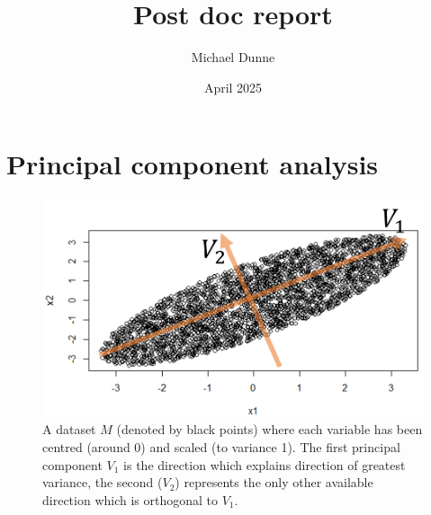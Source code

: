\documentclass{article}
\title{Post doc report}
\author{Michael Dunne}
\date{April 2025}
\newcommand{\RSingVecs}{V}
\newcommand{\sampleMat}{M}
\begin{document}
\maketitle
\nocite{python}

\section{Principal component analysis}
\label{section:dim.red}
\begin{figure}
    \centering
    \includegraphics[width=\linewidth]{PCA_example.png}
    \caption{A dataset $\sampleMat$ (denoted by black points) where each variable has been centred (around 0) and scaled (to variance 1). The first principal component $\RSingVecs_1$ is the direction which explains direction of greatest variance, the second ($\RSingVecs_2$) represents the only other available direction which is orthogonal to $\RSingVecs_1$.}
    \label{fig:pca_example}
\end{figure}
\end{document}
